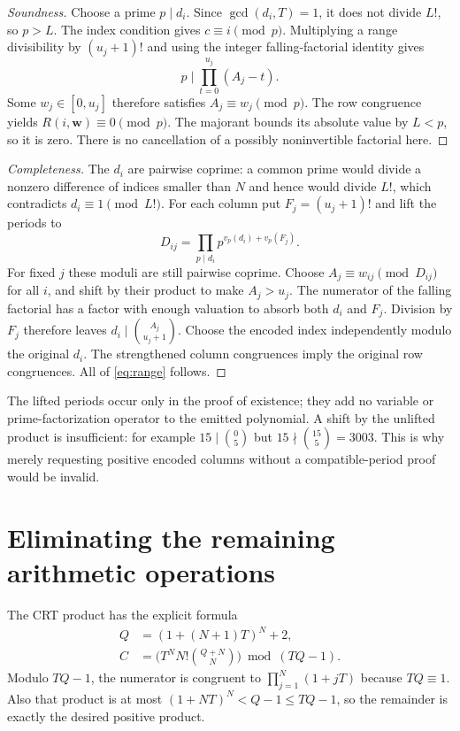 \documentclass[11pt]{article}
\theoremstyle{definition}
\theoremstyle{remark}
\begin{document}
\begin{proof}[Soundness]
Choose a prime $p\mid d_i$. Since $\gcd(d_i,T)=1$, it does not divide
$L!$, so $p>L$. The index condition gives $c\equiv i\pmod p$.
Multiplying a range divisibility by $(u_j+1)!$ and using the integer
falling-factorial identity gives
\[
 p\mid\prod_{t=0}^{u_j}(A_j-t).
\]
Some $w_j\in[0,u_j]$ therefore satisfies $A_j\equiv w_j\pmod p$.
The row congruence yields $R(i,\mathbf w)\equiv0\pmod p$.
The majorant bounds its absolute value by $L<p$, so it is zero.
There is no cancellation of a possibly noninvertible factorial here.
\end{proof}

\begin{proof}[Completeness]
The $d_i$ are pairwise coprime: a common prime would divide a nonzero
difference of indices smaller than $N$ and hence would divide $L!$,
which contradicts $d_i\equiv1\pmod{L!}$.
For each column put $F_j=(u_j+1)!$ and lift the periods to
\[
 D_{ij}=\prod_{p\mid d_i}p^{v_p(d_i)+v_p(F_j)}.
\]
For fixed $j$ these moduli are still pairwise coprime. Choose
$A_j\equiv w_{ij}\pmod{D_{ij}}$ for all $i$, and shift by their product
to make $A_j>u_j$. The numerator of the falling factorial has a factor
with enough valuation to absorb both $d_i$ and $F_j$. Division by
$F_j$ therefore leaves $d_i\mid\binom{A_j}{u_j+1}$.
Choose the encoded index independently modulo the original $d_i$.
The strengthened column congruences imply the original row congruences.
All of \eqref{eq:range} follows.
\end{proof}

The lifted periods occur only in the proof of existence; they add no
variable or prime-factorization operator to the emitted polynomial.
A shift by the unlifted product is insufficient: for example
$15\mid\binom0{5}$ but $15\nmid\binom{15}{5}=3003$.
This is why merely requesting positive encoded columns without a
compatible-period proof would be invalid.

\section{Eliminating the remaining arithmetic operations}

The CRT product has the explicit formula
\begin{align*}
 Q&=(1+(N+1)T)^N+2,\\
 C&=\bigl(T^N N!\binom{Q+N}{N}\bigr)\bmod(TQ-1).
\end{align*}
Modulo $TQ-1$, the numerator is congruent to
$\prod_{j=1}^N(1+jT)$ because $TQ\equiv1$.
Also that product is at most $(1+NT)^N<Q-1\le TQ-1$,
so the remainder is exactly the desired positive product.
\end{document}
